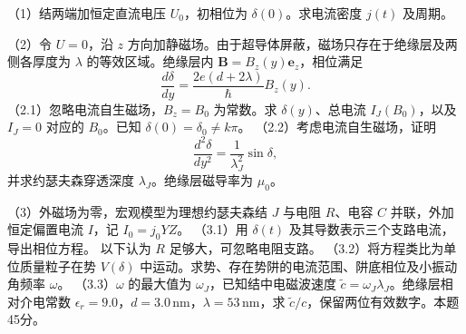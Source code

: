 \documentclass[12pt,a4paper,fontset=fandol]{ctexart}
\begin{document}
（1）结两端加恒定直流电压 \(U_0\)，初相位为 \(\delta(0)\)。求电流密度
\(j(t)\) 及周期。

（2）令 \(U=0\)，沿 \(z\)
方向加静磁场。由于超导体屏蔽，磁场只存在于绝缘层及两侧各厚度为
\(\lambda\) 的等效区域。绝缘层内
\(\mathbf B=B_z(y)\mathbf e_z\)，相位满足 \[
\frac{d\delta}{dy}=\frac{2e(d+2\lambda)}{\hbar}B_z(y).
\] （2.1）忽略电流自生磁场，\(B_z=B_0\) 为常数。求 \(\delta(y)\)、总电流
\(I_J(B_0)\)，以及 \(I_J=0\) 对应的 \(B_0\)。已知
\(\delta(0)=\delta_0\ne k\pi\)。 （2.2）考虑电流自生磁场，证明 \[
\frac{d^2\delta}{dy^2}=\frac1{\lambda_J^2}\sin\delta,
\] 并求约瑟夫森穿透深度 \(\lambda_J\)。绝缘层磁导率为 \(\mu_0\)。

（3）外磁场为零，宏观模型为理想约瑟夫森结 \(J\) 与电阻 \(R\)、电容 \(C\)
并联，外加恒定偏置电流 \(I\)，记 \(I_0=j_0YZ\)。 （3.1）用 \(\delta(t)\)
及其导数表示三个支路电流，导出相位方程。 以下认为 \(R\)
足够大，可忽略电阻支路。 （3.2）将方程类比为单位质量粒子在势
\(V(\delta)\) 中运动。求势、存在势阱的电流范围、阱底相位及小振动角频率
\(\omega\)。 （3.3）\(\omega\) 的最大值为
\(\omega_J\)，已知结中电磁波速度
\(\tilde c=\omega_J\lambda_J\)。绝缘层相对介电常数
\(\epsilon_r=9.0\)，\(d=3.0\,\mathrm{nm}\)，\(\lambda=53\,\mathrm{nm}\)，求
\(\tilde c/c\)，保留两位有效数字。本题45分。

\begin{center}
\begin{minipage}{\linewidth}
\centering\begingroup
{}
\ifdim\wd\diagrambox>.88\linewidth
\sbox{\diagrambox}{\resizebox{.88\linewidth}{!}{\usebox{\diagrambox}}}
\fi
\ifdim\ht\diagrambox>.40\textheight
\resizebox{!}{.40\textheight}{\usebox{\diagrambox}}
\else\usebox{\diagrambox}\fi
\par{}
\endgroup\end{minipage}
\end{center}
\end{document}
